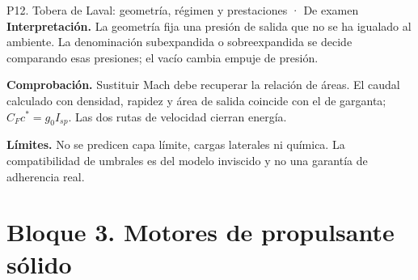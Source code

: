 \begin{studiumworked}{P12. Tobera de Laval: geometría, régimen y prestaciones · De examen}
\textbf{Interpretación.} La geometría fija una presión de salida que no se ha igualado al ambiente. La denominación subexpandida o sobreexpandida se decide comparando esas presiones; el vacío cambia empuje de presión.

\textbf{Comprobación.} Sustituir Mach debe recuperar la relación de áreas. El caudal calculado con densidad, rapidez y área de salida coincide con el de garganta; $C_Fc^*=g_0I_{sp}$. Las dos rutas de velocidad cierran energía.

\textbf{Límites.} No se predicen capa límite, cargas laterales ni química. La compatibilidad de umbrales es del modelo inviscido y no una garantía de adherencia real.
\end{studiumworked}
\chapter{Bloque 3. Motores de propulsante sólido}
